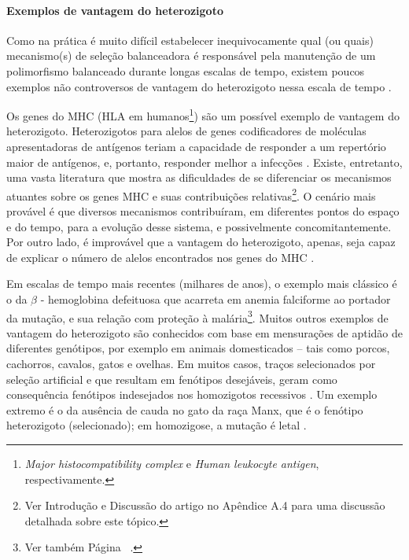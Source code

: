 \begin{refsection}
\paragraph{Exemplos de vantagem do heterozigoto} 
Como na prática é muito difícil estabelecer inequivocamente qual (ou quais) mecanismo(s) de seleção balanceadora é responsável pela manutenção de um polimorfismo balanceado durante longas escalas de tempo, existem poucos exemplos não controversos de vantagem do heterozigoto nessa escala de tempo \parencite{Charlesworth2010}. 

%
	Os genes do MHC (HLA em humanos\footnote{\emph{Major histocompatibility complex} e \emph{Human leukocyte antigen}, respectivamente.}) são um possível exemplo de vantagem do heterozigoto. Heterozigotos para alelos de genes codificadores de moléculas apresentadoras de antígenos teriam a capacidade de responder a um repertório maior de antígenos, e, portanto, responder melhor a infecções \parencite{Doherty1975}. Existe, entretanto, uma vasta literatura que mostra as dificuldades de se diferenciar os mecanismos atuantes sobre os genes MHC e suas contribuições relativas\footnote{Ver Introdução e Discussão do artigo no Apêndice A.4 para uma discussão detalhada sobre este tópico.}. O cenário mais provável é que diversos mecanismos contribuíram, em diferentes pontos do espaço e do tempo, para a evolução desse sistema, e possivelmente concomitantemente. Por outro lado, é improvável que a vantagem do heterozigoto, apenas, seja capaz de explicar o número de alelos encontrados nos genes do MHC \parencite{DeBoer2004}.
   
    
%
	Em escalas de tempo mais recentes (milhares de anos), o exemplo mais clássico é o da $\beta$ - hemoglobina defeituosa que acarreta em anemia falciforme ao portador da mutação, e sua relação com proteção à malária\footnote{Ver também Página ~\pageref{page:HbS}.}. Muitos outros exemplos de vantagem do heterozigoto são conhecidos com base em mensurações de aptidão de diferentes genótipos, por exemplo em animais domesticados -- tais como porcos, cachorros, cavalos, gatos e ovelhas. Em muitos casos, traços selecionados por seleção artificial e que resultam em fenótipos desejáveis, geram como consequência fenótipos indesejados nos homozigotos recessivos \parencite{Hedrick2012}. Um exemplo extremo é o da ausência de cauda no gato da raça Manx, que é o fenótipo heterozigoto (selecionado); em homozigose, a mutação é letal \parencite{Hedrick2012}. 


\end{refsection}
